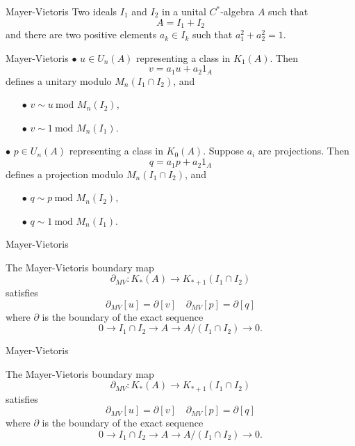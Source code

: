 \begin{frame}{Mayer-Vietoris}
Two ideals $I_1$ and $I_2$ in a unital $C^*$-algebra $A$ such that 
\[A= I_1 + I_2\]
and there are two positive elements $a_k  \in I_k$ such that $a_1^2+a_2^2 = 1$.\\
\end{frame}

\begin{frame}{Mayer-Vietoris}
$\bullet$ $u \in U_n(A)$ representing a class in $K_1(A)$. Then
\[v = a_1 u +a_2 1_A\]
defines a unitary modulo $M_n(I_1\cap I_2)$, and
\begin{itemize}
\item[$\bullet$] $v \sim u \  \text{mod } M_n(I_2)$,
\item[$\bullet$] $v \sim 1 \  \text{mod } M_n(I_1)$.
\end{itemize}
$\bullet$ $p \in U_n(A)$ representing a class in $K_0(A)$. Suppose $a_i$ are projections. Then
\[q = a_1 p +a_2 1_A\]
defines a projection modulo $M_n(I_1\cap I_2)$, and
\begin{itemize}
\item[$\bullet$] $q \sim p \  \text{mod } M_n(I_2)$,
\item[$\bullet$] $q \sim 1 \  \text{mod } M_n(I_1)$.
\end{itemize}
\end{frame}

\begin{frame}{Mayer-Vietoris}
\begin{propfr}
The Mayer-Vietoris boundary map \[\partial_{MV} : K_*(A) \rightarrow K_{*+1}(I_1\cap I_2)\]
satisfies \[\partial_{MV}[u]=  \partial [v] \quad \partial_{MV}[p]=  \partial [q]\]
where $\partial$ is the boundary of the exact sequence
\[0 \rightarrow I_1\cap I_2 \rightarrow  A \rightarrow  A/(I_1\cap I_2) \rightarrow  0.\]
\end{propfr}
\end{frame} 

\begin{frame}{Mayer-Vietoris}
\begin{propfr}
The Mayer-Vietoris boundary map \[\partial_{MV} : K_*(A) \rightarrow K_{*+1}(I_1\cap I_2)\]
satisfies \[\partial_{MV}[u]=  \partial [v] \quad \partial_{MV}[p]=  \partial [q]\]
where $\partial$ is the boundary of the exact sequence
\[0 \rightarrow I_1\cap I_2 \rightarrow  A \rightarrow  A/(I_1\cap I_2) \rightarrow  0.\]
\end{propfr}
\end{frame} 

